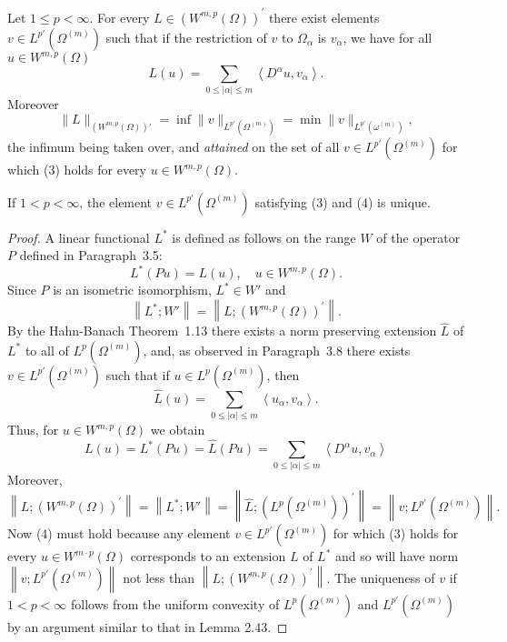 \begin{theorem}
  Let $1 \leq p<\infty$. For every $L \in\left(W^{m, p}(\Omega)\right)^{\prime}$ there exist 
  elements $v \in L^{p'}(\Omega^{(m)})$ such that if the restriction of $v$ to 
  $\Omega_\alpha$ is $v_\alpha$, we have for all $u \in W^{m, p}(\Omega)$
  \begin{equation}\label{eq:3.3}
  L(u)=\sum_{0 \leq|\alpha| \leq m}\left\langle D^\alpha u, v_\alpha\right\rangle .
  \end{equation}
  Moreover
  \begin{equation}\label{eq:3.4}
    \|L\|_{(W^{m,p}(\Omega))'} = \inf \|v\|_{L^{p'}(\Omega^{(m)})}
    = \min \|v\|_{L^{p'}(\omega^{(m)})},
  \end{equation}
  the infimum being taken over, and \emph{attained} on the set of all $v\in L^{p'}(\Omega^{(m)})$
  for which (3) holds for every $u\in W^{m,p}(\Omega)$.

  If $1<p<\infty$, the element $v \in L^{p'}(\Omega^{(m)})$ satisfying (3) and (4) is unique.
\end{theorem}


\begin{proof}
  A linear functional $L^*$ is defined as follows on the range $W$ of the operator $P$
  defined in Paragraph~3.5:
  \[
  L^*(Pu) = L(u), \quad u \in W^{m, p}(\Omega) .
  \]
  Since $P$ is an isometric isomorphism, $L^* \in W'$ and
  \[
  \left\|L^* ; W'\right\|=\left\|L ;\left(W^{m, p}(\Omega)\right)^{\prime}\right\| .
  \]
  By the Hahn-Banach Theorem~1.13 there exists a norm preserving extension $\hat{L}$ of $L^*$
  to all of $L^p(\Omega^{(m)})$, and, as observed in Paragraph~3.8
  there exists $v \in L^{p'}(\Omega^{(m)})$ such that if $u \in L^p(\Omega^{(m)})$, then
  \[
  \hat{L}(u) = \sum_{0 \leq|\alpha| \leq m}\left\langle u_\alpha, v_\alpha\right\rangle .
  \]
  Thus, for $u \in W^{m, p}(\Omega)$ we obtain
  \[
  L(u)=L^*(P u)=\hat{L}(P u)=\sum_{0 \leq|\alpha| \leq m}\left\langle D^\alpha u, v_\alpha\right\rangle
  \]
  Moreover,
  \[
  \left\|L ;\left(W^{m, p}(\Omega)\right)^{\prime}\right\|
    = \left\|L^* ; W'\right\|
    = \left\|\hat{L} ;\left(L^p(\Omega^{(m)})\right)^{\prime}\right\|
    = \left\|v ; L^{p'}(\Omega^{(m)})\right\| .
  \]
  Now (4) must hold because any element $v \in L^{p'}(\Omega^{(m)})$ for which (3) holds for every $u \in W^{m \cdot p}(\Omega)$ corresponds to an extension $L$ of $L^*$ and so will have norm $\left\|v ; L^{p'}(\Omega^{(m)})\right\|$ not less than $\left\|L ;\left(W^{m, p}(\Omega)\right)^{\prime}\right\|$.
  The uniqueness of $v$ if $1<p<\infty$ follows from the uniform convexity of $L^p(\Omega^{(m)})$ and $L^{p'}(\Omega^{(m)})$ by an argument similar to that in Lemma 2.43.
\end{proof}


